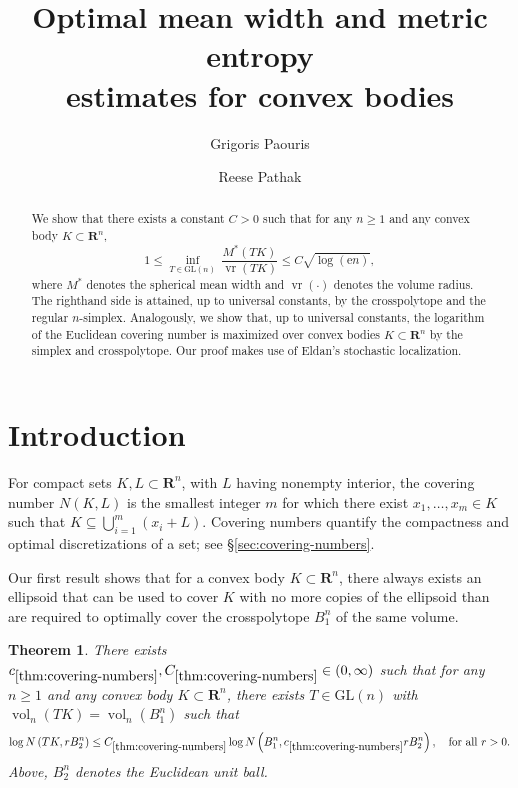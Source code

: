 \documentclass[11pt]{amsart}
\title[Mean width and metric entropy of convex bodies]
{Optimal mean width and metric entropy \\ estimates for convex bodies}
\author{Grigoris Paouris}
\author{Reese Pathak}
\newcommand{\R}{\mathbf R}
\newcommand{\Vol}{\operatorname{vol}}
\newcommand{\GL}{\mathrm{GL}}
\newcommand{\vrad}{\operatorname{vr}}
\let\vr\vrad
\newcommand{\1}{\mathbf 1}
\newcommand{\e}{\mathrm{e}}
\let\vol\Vol
\theoremstyle{plain}
\newtheorem{theorem}{Theorem}[section]
\begin{document}
\begin{abstract}
We show that there exists a constant $C > 0$ such that for any $n \geq 1$ and any convex body $K \subset \R^n$,
\[
1 \leq \inf_{T \in \GL(n)} \, \frac{M^\ast(TK)}{\vr(TK)} 
 \leq C\sqrt{\log(\e n)},
\]
where $M^\ast$ denotes the spherical mean width and $\vr(\cdot)$ denotes the volume radius. The righthand side is attained, up to universal constants, by the crosspolytope and the regular $n$-simplex. Analogously, we show that, up to universal constants, the logarithm of the Euclidean covering number is maximized over convex bodies $K \subset \R^n$ by the simplex and crosspolytope. 
Our proof makes use of Eldan's stochastic localization.
\end{abstract}

\maketitle

\section{Introduction}


For compact sets $K,L\subset \R^{n}$, with $L$ having
nonempty interior, the covering number $N(K,L)$ is the smallest integer \(m\) for which there exist
\(x_{1},\ldots,x_{m}\in K\) such that
$
K\subseteq \bigcup_{i=1}^{m}(x_{i}+L).
$
Covering numbers quantify the compactness and optimal discretizations of a set; see \S\ref{sec:covering-numbers}.

Our first result shows that for a convex body $K \subset \R^n$, there always exists an ellipsoid that can be used to cover $K$ with no more copies of the ellipsoid than are required to optimally cover the crosspolytope $B^n_1$ of the same volume.
\begin{theorem}
\label{thm:covering-numbers}
There exists $c_{\ref{thm:covering-numbers}}, C_{\ref{thm:covering-numbers}} \in (0, \infty)$ such that for any $n \geq 1$ and any convex body $K\subset\R^{n}$, there exists $T \in \GL(n)$ with $\vol_n(TK) = \vol_n(B^n_1)$ such that \begin{equation}
\label{THM1-1}
\log N\left(TK,rB_{2}^{n}\right)
\leq
  C_{\ref{thm:covering-numbers}}\log N\left( B_{1}^{n},c_{\ref{thm:covering-numbers}}rB_{2}^{n}\right), \quad \mbox{for all}~r > 0.
\end{equation}
Above, $B_{2}^{n}$ denotes the Euclidean unit ball.
\end{theorem}
 
\end{document}
